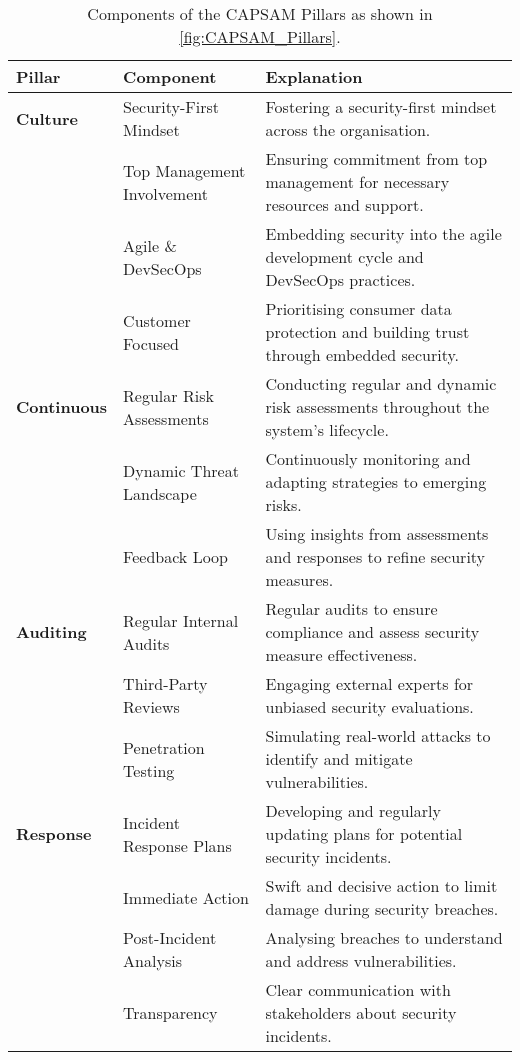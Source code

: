 \begin{longtable}{|>{\raggedright}m{2.5cm}|>{\raggedright}m{3.5cm}|>{\raggedright\arraybackslash}m{8cm}|}
    \caption{Components of the CAPSAM Pillars as shown in \ref{fig:CAPSAM_Pillars}.}
    \label{tab:CAPSAM_Pillars_Components} \\
    \hline
    \textbf{Pillar} & \textbf{Component} & \textbf{Explanation} \\
    \hline\hline
    \endhead

    \textbf{Culture} & Security-First Mindset & Fostering a security-first mindset across the organisation. \\
    \cline{2-3}
    & Top Management Involvement & Ensuring commitment from top management for necessary resources and support. \\
    \cline{2-3}
    & Agile \& DevSecOps & Embedding security into the agile development cycle and DevSecOps practices. \\
    \cline{2-3}
    & Customer Focused & Prioritising consumer data protection and building trust through embedded security. \\
    \hline\hline

    \textbf{Continuous} & Regular Risk Assessments & Conducting regular and dynamic risk assessments throughout the system's lifecycle. \\
    \cline{2-3}
    & Dynamic Threat Landscape & Continuously monitoring and adapting strategies to emerging risks. \\
    \cline{2-3}
    & Feedback Loop & Using insights from assessments and responses to refine security measures. \\
    \hline\hline

    \textbf{Auditing} & Regular Internal Audits & Regular audits to ensure compliance and assess security measure effectiveness. \\
    \cline{2-3}
    & Third-Party Reviews & Engaging external experts for unbiased security evaluations. \\
    \cline{2-3}
    & Penetration Testing & Simulating real-world attacks to identify and mitigate vulnerabilities. \\
    \hline\hline

    \textbf{Response} & Incident Response Plans & Developing and regularly updating plans for potential security incidents. \\
    \cline{2-3}
    & Immediate Action & Swift and decisive action to limit damage during security breaches. \\
    \cline{2-3}
    & Post-Incident Analysis & Analysing breaches to understand and address vulnerabilities. \\
    \cline{2-3}
    & Transparency & Clear communication with stakeholders about security incidents. \\
    \hline\hline


\end{longtable}
